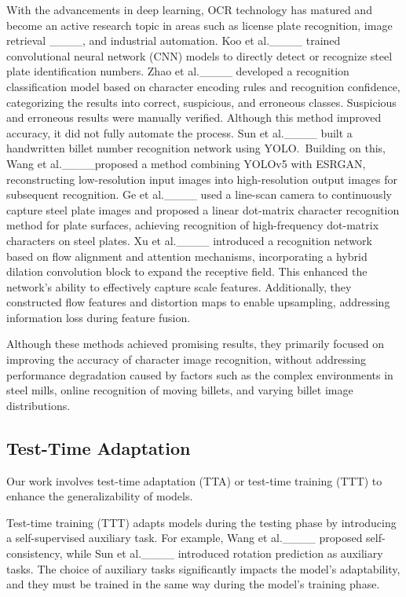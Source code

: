 With the advancements in deep learning, OCR technology has matured and become an active research topic in areas such as license plate recognition, image retrieval ____, and industrial automation. Koo et al.____ trained convolutional neural network (CNN) models to directly detect or recognize steel plate identification numbers. Zhao et al.____ developed a recognition classification model based on character encoding rules and recognition confidence, categorizing the results into correct, suspicious, and erroneous classes. Suspicious and erroneous results were manually verified. Although this method improved accuracy, it did not fully automate the process. Sun et al.____ built a handwritten billet number recognition network using YOLO.\  Building on this, Wang et al.____proposed a method combining YOLOv5 with ESRGAN, reconstructing low-resolution input images into high-resolution output images for subsequent recognition. Ge et al.____ used a line-scan camera to continuously capture steel plate images and proposed a linear dot-matrix character recognition method for plate surfaces, achieving recognition of high-frequency dot-matrix characters on steel plates. Xu et al.____ introduced a recognition network based on flow alignment and attention mechanisms, incorporating a hybrid dilation convolution block to expand the receptive field. This enhanced the network's ability to effectively capture scale features. Additionally, they constructed flow features and distortion maps to enable upsampling, addressing information loss during feature fusion.

Although these methods achieved promising results, they primarily focused on improving the accuracy of character image recognition, without addressing performance degradation caused by factors such as the complex environments in steel mills, online recognition of moving billets, and varying billet image distributions.

 



\subsection{Test-Time Adaptation}

Our work involves test-time adaptation (TTA) or test-time training (TTT) to enhance the generalizability of models.

Test-time training (TTT) adapts models during the testing phase by introducing a self-supervised auxiliary task. For example, Wang et al.____ proposed self-consistency, while Sun et al.____ introduced rotation prediction as auxiliary tasks. The choice of auxiliary tasks significantly impacts the model's adaptability, and they must be trained in the same way during the model’s training phase.

